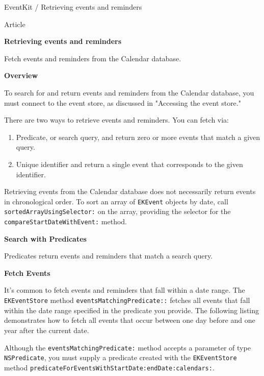 \documentclass{article}
\title{}
\author{}
\date{}
\begin{document}
EventKit / Retrieving events and reminders

Article

\textbf{Retrieving events and reminders}

Fetch events and reminders from the Calendar database.

\textbf{Overview}

To search for and return events and reminders from the Calendar database, you must connect to the event store, as discussed in "Accessing the event store."

There are two ways to retrieve events and reminders. You can fetch via:

\begin{enumerate}
    \item Predicate, or search query, and return zero or more events that match a given query.
    \item Unique identifier and return a single event that corresponds to the given identifier.
\end{enumerate}

\hrulefill

Retrieving events from the Calendar database does not necessarily return events in chronological order. To sort an array of \texttt{EKEvent} objects by date, call \texttt{sortedArrayUsingSelector:} on the array, providing the selector for the \texttt{compareStartDateWithEvent:} method.

\hrulefill

\textbf{Search with Predicates}

Predicates return events and reminders that match a search query.

\textbf{Fetch Events}

It's common to fetch events and reminders that fall within a date range. The \texttt{EKEventStore} method \texttt{eventsMatchingPredicate::} fetches all events that fall within the date range specified in the predicate you provide. The following listing demonstrates how to fetch all events that occur between one day before and one year after the current date.

\hrulefill

Although the \texttt{eventsMatchingPredicate:} method accepts a parameter of type \texttt{NSPredicate}, you must supply a predicate created with the \texttt{EKEventStore} method \texttt{predicateForEventsWithStartDate:endDate:calendars:}.

\hrulefill
\end{document}
